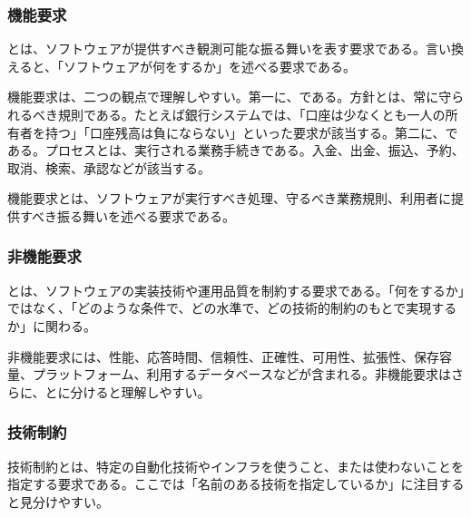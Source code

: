 
\subsubsection{機能要求}

とは、ソフトウェアが提供すべき観測可能な振る舞いを表す要求である。言い換えると、「ソフトウェアが何をするか」を述べる要求である。

機能要求は、二つの観点で理解しやすい。第一に、である。方針とは、常に守られるべき規則である。たとえば銀行システムでは、「口座は少なくとも一人の所有者を持つ」「口座残高は負にならない」といった要求が該当する。第二に、である。プロセスとは、実行される業務手続きである。入金、出金、振込、予約、取消、検索、承認などが該当する。

\begin{definitionbox}機能要求とは、ソフトウェアが実行すべき処理、守るべき業務規則、利用者に提供すべき振る舞いを述べる要求である。\end{definitionbox}

\subsubsection{非機能要求}

とは、ソフトウェアの実装技術や運用品質を制約する要求である。「何をするか」ではなく、「どのような条件で、どの水準で、どの技術的制約のもとで実現するか」に関わる。

非機能要求には、性能、応答時間、信頼性、正確性、可用性、拡張性、保存容量、プラットフォーム、利用するデータベースなどが含まれる。非機能要求はさらに、とに分けると理解しやすい。


\subsubsection{技術制約}

技術制約とは、特定の自動化技術やインフラを使うこと、または使わないことを指定する要求である。ここでは「名前のある技術を指定しているか」に注目すると見分けやすい。

